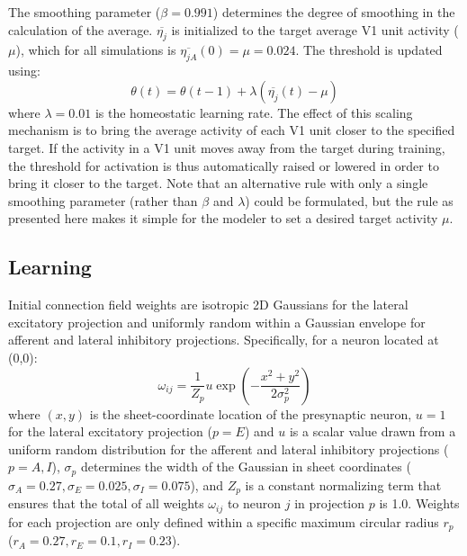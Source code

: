 The smoothing parameter ($\beta=0.991$) determines the degree of
smoothing in the calculation of the average. $\overline{\eta_{j}}$ is
initialized to the target average V1 unit activity ($\mu$), which for
all simulations is $\overline{\eta_{jA}}(0) = \mu= 0.024$. The
threshold is updated using:
\begin{equation}
\label{eqn:thresholdupdate}%
\theta(t)= \theta(t-1) + \lambda(\overline{\eta_{j}}(t) -\mu)
\end{equation}
where $\lambda=0.01$ is the homeostatic learning rate. The effect of
this scaling mechanism is to bring the average activity of each V1
unit closer to the specified target. If the activity in a V1 unit
moves away from the target during training, the threshold for
activation is thus automatically raised or lowered in order to bring
it closer to the target. Note that an alternative rule with only a
single smoothing parameter (rather than $\beta$ and $\lambda$) could
be formulated, but the rule as presented here makes it simple for the
modeler to set a desired target activity $\mu$.

\subsection*{Learning}

Initial connection field weights are isotropic 2D Gaussians for the
lateral excitatory projection and uniformly random within a Gaussian
envelope for afferent and lateral inhibitory
projections. Specifically, for a neuron located at (0,0):
\begin{equation}
\omega_{ij}=\frac{1}{Z_p}u\exp\left(-\frac{x^{2}+y^{2}}{2\sigma_{p}^{2}}\right)
\label{eqn:gaussrandomweights}
\end{equation}
where $(x, y)$ is the sheet-coordinate location of the presynaptic
neuron, $u=1$ for the lateral excitatory projection ($p=E$) and $u$ is
a scalar value drawn from a uniform random distribution for the
afferent and lateral inhibitory projections ($p=A,I$), $\sigma_{p}$
determines the width of the Gaussian in sheet coordinates
($ \sigma_{A}=0.27, \sigma_{E}=0.025, \sigma_{I}=0.075$), and $Z_p$ is
a constant normalizing term that
ensures that the total of all weights $\omega_{ij}$ to neuron $j$ in
projection $p$ is 1.0.  Weights for
each projection are only defined within a specific maximum circular
radius $r_p$ ($r_{A}=0.27, r_{E}=0.1, r_{I}=0.23$).

